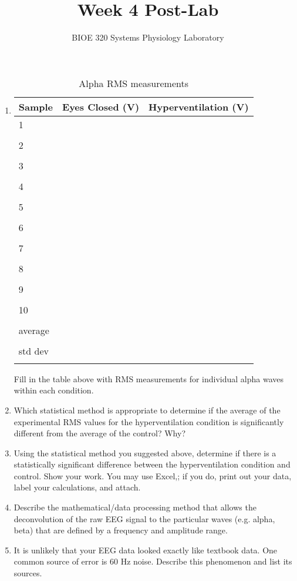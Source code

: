 \documentclass{article}
\title{Week 4 Post-Lab}
\author{BIOE 320 Systems Physiology Laboratory}
\date{}
\begin{document}
\maketitle
\large

\begin{enumerate}
	\item
	\begin{table}[h]
	\centering
	\caption{Alpha RMS measurements}
	\begin{tabular}[h!]{p{}|p{}p{}}
	\toprule
	Sample & Eyes Closed (\textmu V) & Hyperventilation (\textmu V)\\
	\midrule
	1 & &\\ & &\\ \midrule
	2 & &\\ & &\\ \midrule
	3 & &\\ & &\\ \midrule
	4 & &\\ & &\\ \midrule
	5 & &\\ & &\\ \midrule
	6 & &\\ & &\\ \midrule
	7 & &\\ & &\\ \midrule
	8 & &\\ & &\\ \midrule
	9 & &\\ & &\\ \midrule
	10 & &\\ & &\\ \bottomrule
	average & &\\ & &\\ \midrule
	std dev & &\\ & &\\ \bottomrule
	\end{tabular}
	\end{table}
	\large
	
	Fill in the table above with RMS measurements for individual alpha waves within each condition.
	\item Which statistical method is appropriate to determine if the average of the experimental RMS values for the hyperventilation condition is significantly different from the average of the control? Why?
	\item Using the statistical method you suggested above, determine if there is a statistically significant difference between the hyperventilation condition and control. Show your work. You may use Excel,; if you do, print out your data, label your calculations, and attach.
	\item Describe the mathematical/data processing method that allows the deconvolution of the raw EEG signal to the particular waves (e.g. alpha, beta) that are defined by a frequency and amplitude range.
	\item It is unlikely that your EEG data looked exactly like textbook data. One common source of error is 60 Hz noise. Describe this phenomenon and list its sources.
\end{enumerate}
\end{document}
